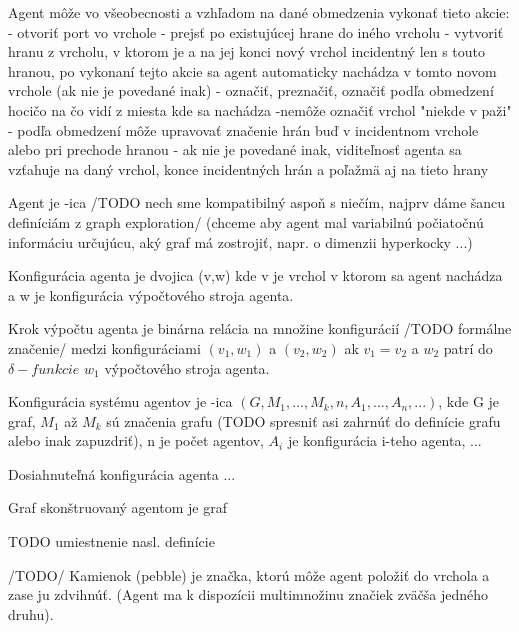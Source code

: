 Agent môže vo všeobecnosti a vzhľadom na dané obmedzenia vykonať tieto akcie:
- otvoriť port vo vrchole
- prejsť po existujúcej hrane do iného vrcholu
- vytvoriť hranu z vrcholu, v ktorom je a na jej konci nový vrchol incidentný len s touto hranou, po vykonaní tejto akcie sa agent automaticky nachádza v tomto novom vrchole (ak nie je povedané inak)
- označiť, preznačiť, označiť podľa obmedzení hocičo na čo vidí z miesta kde sa nachádza
	-nemôže označiť vrchol "niekde v paži"
	- podľa obmedzení môže upravovať značenie hrán buď v incidentnom vrchole alebo pri prechode hranou
- ak nie je povedané inak, viditeľnosť agenta sa vzťahuje na daný vrchol, konce incidentných hrán a poľažmä aj na tieto hrany

\begin{defin}
Agent je -ica /TODO nech sme kompatibilný aspoň s niečím, najprv dáme šancu definíciám z graph exploration/
(chceme aby agent mal variabilnú počiatočnú informáciu určujúcu, aký graf má zostrojiť, napr. o dimenzii hyperkocky ...)
\end{defin}

\begin{defin}
Konfigurácia agenta je dvojica (v,w) kde v je vrchol v ktorom sa agent nachádza a w je konfigurácia výpočtového stroja agenta.
\end{defin}

\begin{defin}
Krok výpočtu agenta je binárna relácia na množine konfigurácií /TODO formálne značenie/ medzi konfiguráciami $(v_1,w_1)$ a $(v_2,w_2)$ ak $v_1 = v_2$ a $w_2$ patrí do $\delta -funkcie$ $w_1$ výpočtového stroja agenta.
\end{defin}

\begin{defin}
Konfigurácia systému agentov je -ica $(G,M_1,...,M_k,n,A_1,...,A_n,...)$, kde G je graf, $M_1$ až $M_k$ sú značenia grafu (TODO spresniť asi zahrnúť do definície grafu alebo inak zapuzdriť), n je počet agentov, $A_i$ je konfigurácia i-teho agenta, ...
\end{defin}

\begin{defin}
Dosiahnuteľná konfigurácia agenta ...
\end{defin}

\begin{defin}
Graf skonštruovaný agentom je graf
\end{defin}

TODO umiestnenie nasl. definície
\begin{defin}
/TODO/ Kamienok (pebble) je značka, ktorú môže agent položiť do vrchola a zase ju zdvihnúť. (Agent ma k dispozícii multimnožinu značiek zväčša jedného druhu).
\end{defin}


